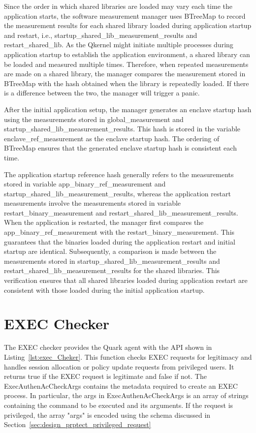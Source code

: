 Since the order in which shared libraries are loaded may vary each time the application starts, the software measurement manager uses BTreeMap to record the measurement results for each shared library loaded during application startup and restart, i.e., startup\_shared\_lib\_measurement\_results 
and restart\_shared\_lib. As the Qkernel might initiate multiple processes during application startup to establish the application environment, a shared library can be loaded and measured multiple times. Therefore, when repeated measurements are made on a shared library, the manager compares 
the measurement stored in BTreeMap with the hash obtained when the library is repeatedly loaded. If there is a difference between the two, the manager will trigger a panic.


After the initial application setup, the manager generates an enclave startup hash using the measurements stored in global\_measurement and startup\_shared\_lib\_measurement\_results. This hash is stored in the variable enclave\_ref\_measurement as the enclave startup hash. The ordering of BTreeMap 
ensures that the generated enclave startup hash is consistent each time.

The application startup reference hash generally refers to the measurements stored in variable app\_binary\_ref\_measurement and startup\_shared\_lib\_measurement\_results, whereas the application restart measurements involve the measurements stored in variable restart\_binary\_measurement and 
restart\_shared\_lib\_measurement\_results. When the application is restarted, the manager first compares the app\_binary\_ref\_measurement with the restart\_binary\_measurement. This guarantees that the binaries loaded during the application restart and initial startup are identical. Subsequently, 
a comparison is made between the measurements stored in startup\_shared\_lib\_measurement\_results and restart\_shared\_lib\_measurement\_results for the shared libraries. This verification ensures that all shared libraries loaded during application restart are consistent 
with those loaded during the initial application startup.



\section{EXEC Checker}
\label{sec:impl_exec}
The EXEC checker provides the Quark agent with the API shown in Listing~\ref{lst:exec_Cheker}. This function checks EXEC requests for legitimacy and handles session allocation or policy update requests from privileged users. It returns true if the EXEC request is legitimate and false if not. 
The ExecAuthenAcCheckArgs contains the metadata required to create an EXEC process. In particular, the args in ExecAuthenAcCheckArgs is an array of strings containing the command to be executed and its arguments. If the request is privileged, the array "args" is encoded using the schema discussed in Section~\ref{sec:design_prptect_privileged_request}

